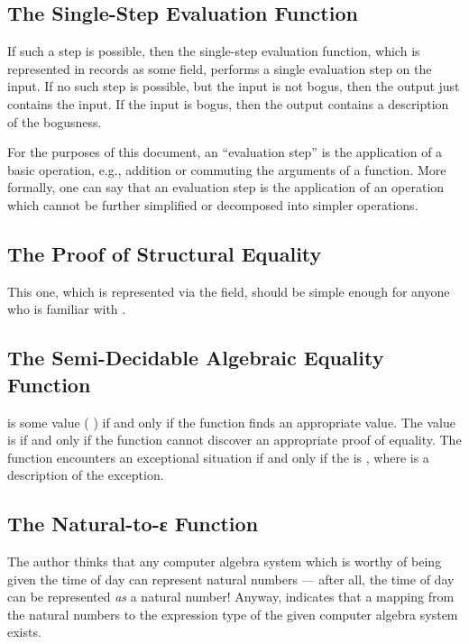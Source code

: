 \documentclass{report}
\begin{document}
\subsection{The Single-Step Evaluation Function}
If such a step is possible, then the single-step evaluation function, which is represented in  records as some  field, performs a single evaluation step on the input.  If no such step is possible, but the input is not bogus, then the output just contains the input.  If the input is bogus, then the output contains a description of the bogusness.

For the purposes of this document, an ``evaluation step'' is the application of a basic operation, e.g., addition or commuting the arguments of a function.  More formally, one can say that an evaluation step is the application of an operation which cannot be further simplified or decomposed into simpler operations.

\subsection{The Proof of Structural Equality}
This one, which is represented via the  field, should be simple enough for anyone who is familiar with .

\subsection{The Semi-Decidable Algebraic Equality Function}
    is some value  \AgdaSymbol( \AgdaSymbol) if and only if the  function finds an appropriate value.  The  value is   if and only if the function cannot discover an appropriate proof of equality.  The function encounters an exceptional situation if and only if the  is  , where  is a description of the exception.

\subsection{The Natural-to-ε Function}
The author thinks that any computer algebra system which is worthy of being given the time of day can represent natural numbers --- after all, the time of day can be represented \emph{as} a natural number!  Anyway,  indicates that a mapping from the natural numbers to the expression type of the given computer algebra system exists.
\end{document}
